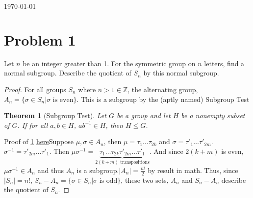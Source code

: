 \documentclass[hidelinks,12pt]{article}
\newtheorem{theorem}{Theorem}
\newcommand{\Z}{\mathbb{Z}}
\begin{document}
\begin{titlepage}
	
	\vfill\vfill\vfill %
	
	{\large\today} %
	
	
	 
	
	\vfill %
	
\end{titlepage}
\section{Problem 1}Let $n$ be an integer greater than 1.  For the symmetric group on $n$ letters, find a normal subgroup. Describe the quotient of $S_n$ by this normal subgroup.\begin{proof}For all groups $S_n$ where $n>1\in \Z$, the alternating group, $A_n=\{\sigma\in S_n|\sigma\text{ is even}\}$. This is a subgroup by the (aptly named) Subgroup Test \begin{theorem}[Subgroup Test]\label{sgtest}Let $G$ be a group and let $H$ be a nonempty subset of $G$. If for all $a,b\in H$, $ab^{-1}\in H$, then $H\leqslant G$. \end{theorem}Proof of \ref{sgtest} \href{https://en.wikipedia.org/wiki/Subgroup_test}{\color{cyan}here}\newline Suppose $\mu,\sigma\in A_n$, then $\mu=\tau_1\dots \tau_{2k}$ and $\sigma=\tau'_1\dots\tau'_{2m}$. $\sigma^{-1}=\tau'_{2m}\dots\tau'_1$. Then  $\mu\sigma^{-1}=\underbrace{\tau_1\dots \tau_{2k}\tau'_{2m}\dots\tau'_1}_{2(k+m)\text{ transpositions}}$. And since $2(k+m)$ is even, $\mu\sigma^{-1}\in A_n$ and thus $A_n$ is a subgroup.\newline $|A_n|=\frac{n!}{2}$ by \href{https://en.wikipedia.org/wiki/Alternating_group}{\color{cyan}{This}} result in math. Thus, since $|S_n|=n!$, $S_n-A_n=\{\sigma\in S_n|\sigma\text{ is odd}\}$, these two sets, $A_n$ and $S_n-A_n$ describe the quotient of $S_n$.
\end{proof}
\end{document}
